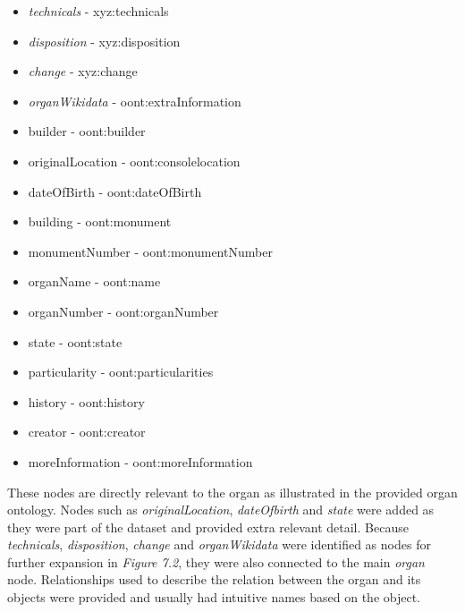 \vspace{-0.15cm}
\begin{itemize}
    \itemsep0em 
    \item \textit{technicals} - xyz:technicals
    \vspace{-0.1cm}
    \item \textit{disposition} - xyz:disposition
    \vspace{-0.1cm}
    \item \textit{change} - xyz:change
    \vspace{-0.1cm}
    \item \textit{organWikidata} - oont:extraInformation
    \vspace{-0.1cm}
    \item builder - oont:builder
    \vspace{-0.1cm}
    \item originalLocation - oont:consolelocation
    \vspace{-0.1cm}
    \item dateOfBirth - oont:dateOfBirth
    \vspace{-0.1cm}
    \item building - oont:monument
    \vspace{-0.1cm}
    \item monumentNumber - oont:monumentNumber
    \vspace{-0.1cm}
    \item organName - oont:name
    \vspace{-0.1cm}
    \item organNumber - oont:organNumber 
    \vspace{-0.1cm}
    \item state - oont:state 
    \vspace{-0.1cm}
    \item particularity - oont:particularities
    \vspace{-0.1cm}
    \item history - oont:history
    \vspace{-0.1cm}
    \item creator - oont:creator
    \vspace{-0.1cm}
    \item moreInformation - oont:moreInformation 
\end{itemize}

These nodes are directly relevant to the organ as illustrated in the provided organ ontology. Nodes such as \textit{originalLocation}, \textit{dateOfbirth} and \textit{state} were added as they were part of the dataset and provided extra relevant detail. Because \textit{technicals}, \textit{disposition}, \textit{change} and \textit{organWikidata} were identified as nodes for further expansion in \textit{Figure 7.2}, they were also connected to the main \textit{organ} node. Relationships used to describe the relation between the organ and its objects were provided and usually had intuitive names based on the object. 

